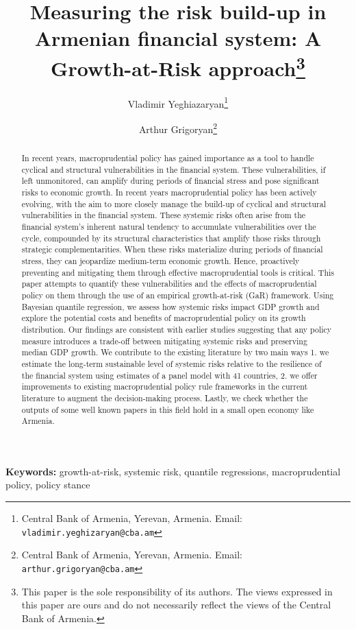 \documentclass[12pt,a4paper]{article}
\title{Measuring the risk build-up in Armenian financial system: A Growth-at-Risk approach\thanks{This paper is the sole responsibility of its authors. The views expressed in this paper are ours and do not necessarily reflect the views of the Central Bank of Armenia.}}
\author{
Vladimir Yeghiazaryan\thanks{Central Bank of Armenia, Yerevan, Armenia. Email: \texttt{vladimir.yeghizaryan@cba.am}}
\and 
Arthur Grigoryan\thanks{Central Bank of Armenia, Yerevan, Armenia. Email: \texttt{arthur.grigoryan@cba.am}}
}
\begin{document}
\onehalfspacing
\captionsetup{font=small}

\maketitle

\begin{abstract}
    In recent years, macroprudential policy has gained importance as a tool to handle cyclical and structural vulnerabilities in the financial system. These vulnerabilities, if left unmonitored, can amplify during periods of financial stress and pose significant risks to economic growth.
    In recent years macroprudential policy has been actively evolving, with the aim to more closely manage the build-up of cyclical and structural vulnerabilities in the financial system. These systemic risks often arise from the financial system's inherent natural tendency to accumulate vulnerabilities over the cycle, compounded by its structural characteristics that amplify those risks through strategic complementarities. When these risks materialize during periods of financial stress, they can jeopardize medium-term economic growth. Hence, proactively preventing and mitigating them through effective macroprudential tools is critical.
    This paper attempts to quantify these vulnerabilities and the effects of macroprudential policy on them through the use of an empirical growth-at-risk (GaR) framework. Using Bayesian quantile regression, we assess how systemic risks impact GDP growth and explore the potential costs and benefits of macroprudential policy on its growth distribution. Our findings are consistent with earlier studies suggesting that any policy measure introduces a trade-off between mitigating systemic risks and preserving median GDP growth. 
    We contribute to the existing literature by two main ways 1. we estimate the long-term sustainable level of systemic risks relative to the resilience of the financial system using estimates of a panel model with 41 countries, 2. we offer improvements to existing macroprudential policy rule frameworks in the current literature to augment the decision-making process. Lastly, we check whether the outputs of some well known papers in this field hold in a small open economy like Armenia.
\end{abstract}

\noindent\textbf{Keywords:} growth-at-risk, systemic risk, quantile regressions, macroprudential policy, policy stance

    
\end{document}
